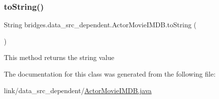 \subsubsection{\texorpdfstring{to\+String()}{toString()}}
{\footnotesize\ttfamily String bridges.\+data\+\_\+src\+\_\+dependent.\+Actor\+Movie\+I\+M\+D\+B.\+to\+String (\begin{DoxyParamCaption}{ }\end{DoxyParamCaption})}

This method returns the string value 

The documentation for this class was generated from the following file\+:\begin{DoxyCompactItemize}
\item 
link/data\+\_\+src\+\_\+dependent/\hyperlink{_actor_movie_i_m_d_b_8java}{Actor\+Movie\+I\+M\+D\+B.\+java}\end{DoxyCompactItemize}
